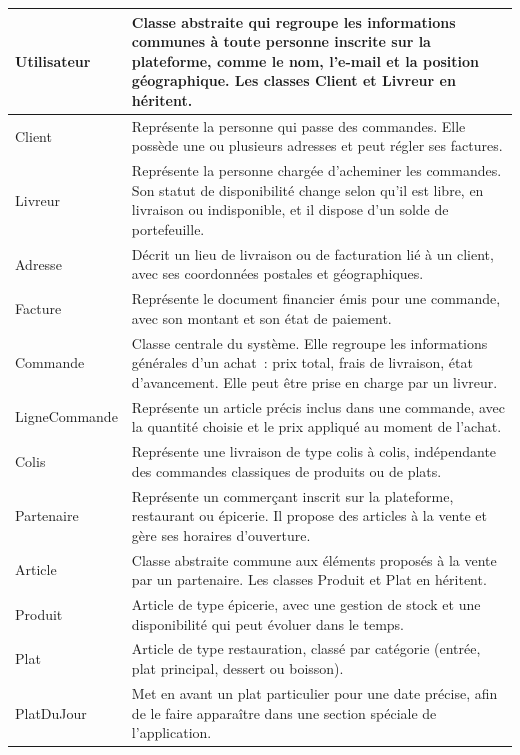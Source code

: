 \documentclass[12pt,fleqn,a4paper]{report}
\begin{document}
\begin{justify}
\begin{longtable}{|l|p{9cm}|}
Utilisateur &
Classe abstraite qui regroupe les informations communes à toute personne inscrite sur la plateforme, comme le nom, l'e-mail et la position géographique. Les classes Client et Livreur en héritent. \\
\hline
Client &
Représente la personne qui passe des commandes. Elle possède une ou plusieurs adresses et peut régler ses factures. \\
\hline
Livreur &
Représente la personne chargée d'acheminer les commandes. Son statut de disponibilité change selon qu'il est libre, en livraison ou indisponible, et il dispose d'un solde de portefeuille. \\
\hline
Adresse &
Décrit un lieu de livraison ou de facturation lié à un client, avec ses coordonnées postales et géographiques. \\
\hline
Facture &
Représente le document financier émis pour une commande, avec son montant et son état de paiement. \\
\hline
Commande &
Classe centrale du système. Elle regroupe les informations générales d'un achat~: prix total, frais de livraison, état d'avancement. Elle peut être prise en charge par un livreur. \\
\hline
LigneCommande &
Représente un article précis inclus dans une commande, avec la quantité choisie et le prix appliqué au moment de l'achat. \\
\hline
Colis &
Représente une livraison de type colis à colis, indépendante des commandes classiques de produits ou de plats. \\
\hline
Partenaire &
Représente un commerçant inscrit sur la plateforme, restaurant ou épicerie. Il propose des articles à la vente et gère ses horaires d'ouverture. \\
\hline
Article &
Classe abstraite commune aux éléments proposés à la vente par un partenaire. Les classes Produit et Plat en héritent. \\
\hline
Produit &
Article de type épicerie, avec une gestion de stock et une disponibilité qui peut évoluer dans le temps. \\
\hline
Plat &
Article de type restauration, classé par catégorie (entrée, plat principal, dessert ou boisson). \\
\hline
PlatDuJour &
Met en avant un plat particulier pour une date précise, afin de le faire apparaître dans une section spéciale de l'application. \\
\hline
\end{longtable}


\end{justify}
\end{document}
